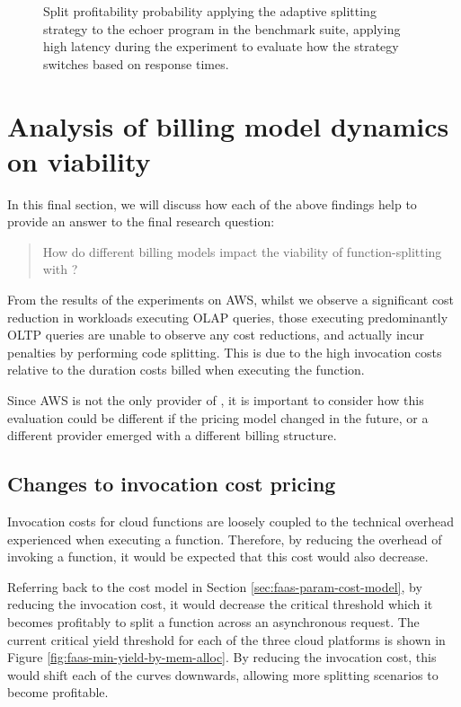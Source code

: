\begin{figure*}
    \begin{center}
        
    \end{center}
    \caption{Split profitability probability applying the adaptive splitting strategy to the echoer program in the benchmark suite, applying high latency during the experiment to evaluate how the strategy switches based on response times.}
    \label{fig:strategy-decision-over-time}
\end{figure*}

\section{Analysis of billing model dynamics on \faaas{} viability}
In this final section, we will discuss how each of the above findings help to provide an answer to the final research question: \blockquote{How do different \faas{} billing models impact the viability of function-splitting with \faaas{}?}.

From the results of the experiments on AWS, whilst we observe a significant cost reduction in workloads executing OLAP queries, those executing predominantly OLTP queries are unable to observe any cost reductions, and actually incur penalties by performing code splitting. This is due to the high invocation costs relative to the duration costs billed when executing the function.

Since AWS is not the only provider of \faas{}, it is important to consider how this evaluation could be different if the pricing model changed in the future, or a different provider emerged with a different billing structure.

\subsection{Changes to invocation cost pricing}
Invocation costs for cloud functions are loosely coupled to the technical overhead experienced when executing a \faas{} function. Therefore, by reducing the overhead of invoking a function, it would be expected that this cost would also decrease.

Referring back to the cost model in Section \ref{sec:faas-param-cost-model}, by reducing the invocation cost, it would decrease the critical threshold which it becomes profitably to split a function across an asynchronous request. The current critical yield threshold for each of the three cloud platforms is shown in Figure \ref{fig:faas-min-yield-by-mem-alloc}. By reducing the invocation cost, this would shift each of the curves downwards, allowing more splitting scenarios to become profitable.

